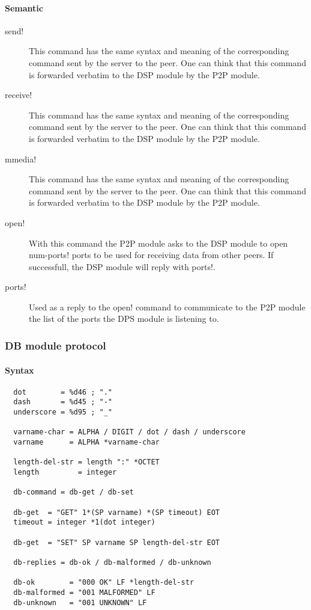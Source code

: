 \documentclass{medusabook}
\begin{document}
\paragraph{Semantic}
\begin{description}
   \item[\ttt send!] This command has the same syntax and meaning of
   the corresponding command sent by the server to the peer.  One can
   think that this command  is forwarded verbatim to the DSP module by
   the P2P module.
   \item[\ttt receive!] This command has the same syntax and meaning of
   the corresponding command sent by the server to the peer.  One can
   think that this command  is forwarded verbatim to the DSP module by
   the P2P module.
   \item[\ttt mmedia!] This command has the same syntax and meaning of
   the corresponding command sent by the server to the peer.  One can
   think that this command  is forwarded verbatim to the DSP module by
   the P2P module.  
   \item[\ttt open!] With this command the P2P module asks to the DSP
   module to open \ttt num-ports! ports to be used for receiving data
   from other peers.  If successfull, the DSP module will reply with 
   \ttt ports!.
   \item[\ttt ports!] Used as a reply to the \ttt open! command to
   communicate to the P2P module the list of the ports the DPS module
   is listening to.
\end{description}
%
\subsubsection{DB module protocol}
\label{sub:2.1.0;medusa_book}

\paragraph{Syntax}


\begin{verbatim}
  dot        = %d46 ; "."
  dash       = %d45 ; "-"
  underscore = %d95 ; "_"

  varname-char = ALPHA / DIGIT / dot / dash / underscore
  varname      = ALPHA *varname-char

  length-del-str = length ":" *OCTET
  length         = integer

  db-command = db-get / db-set

  db-get  = "GET" 1*(SP varname) *(SP timeout) EOT
  timeout = integer *1(dot integer)

  db-get  = "SET" SP varname SP length-del-str EOT

  db-replies = db-ok / db-malformed / db-unknown

  db-ok        = "000 OK" LF *length-del-str
  db-malformed = "001 MALFORMED" LF
  db-unknown   = "001 UNKNOWN" LF
\end{verbatim}
\end{document}
